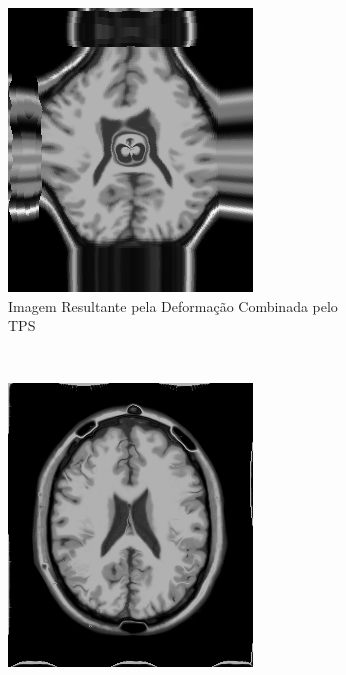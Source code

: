 \documentclass[]{spie}  %
\begin{document}
\begin{figure}[h]
\begin{subfigure}[t]{0.16\textwidth}
	  \includegraphics[width=\textwidth]{../images/resultDistSin.png}
	  \caption{Imagem Resultante pela Deformação Combinada pelo TPS}
	  \label{fig:sindist-image-tps} 
	\end{subfigure} \\
	\begin{subfigure}[t]{0.16\textwidth}
	  \includegraphics[width=\textwidth]{../images/resultSinDemon.png}

\end{subfigure}
\end{figure}
\end{document}
